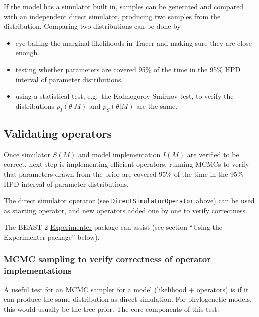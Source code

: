 \documentclass[oneside]{article}
\begin{document}
If the model has a simulator built in, samples can be generated and compared with an 
independent direct simulator, producing two samples from the distribution. Comparing 
two distributions can be done by

\begin{itemize}
\item
  eye balling the marginal likelihoods in Tracer and making sure they
  are close enough.
\item
  testing whether parameters are covered 95\% of the time in the 95\%
  HPD interval of parameter distributions.
\item
  using a statistical test, e.g.~the Kolmogorov-Smirnov test, to verify
  the distributions \(p_I(\theta|M)\) and \(p_S(\theta|M)\) are the
  same.
\end{itemize}


\subsection{Validating operators}

Once simulator \(S(M)\) and model implementation \(I(M)\) are verified
to be correct, next step is implementing efficient operators, running
MCMCs to verify that parameters drawn from the prior are covered 95\% of
the time in the 95\% HPD interval of parameter distributions.

The direct simulator operator (see \texttt{DirectSimulatorOperator}
above) can be used as starting operator, and new operators added one by
one to verify correctness.

The BEAST 2
\href{https://github.com/rbouckaert/Experimenter}{Experimenter} package
can assist (see section ``Using the Experimenter package'' below).

\subsubsection{MCMC sampling to verify correctness of operator
implementations}\label{mcmc-sampling-to-verify-correctness-of-operator-implementations}

A useful test for an MCMC sampler for a model (likelihood + operators)
is if it can produce the same distribution as direct simulation. For
phylogenetic models, this would usually be the tree prior. The core
components of this test:
\end{document}
